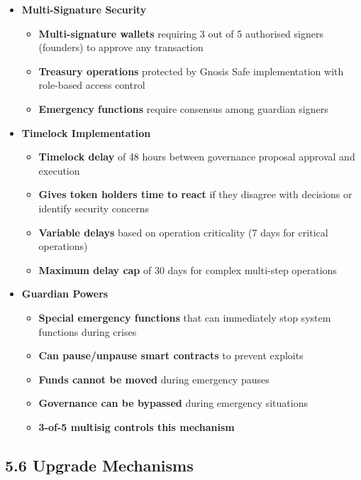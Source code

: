 \documentclass[
  paper=a4,
  ,captions=tableheading
]{scrartcl}
\providecommand{\tightlist}{%
  \setlength{\itemsep}{0pt}\setlength{\parskip}{0pt}}
\begin{document}
\begin{itemize}
\tightlist
\item
  \textbf{Multi-Signature Security}

  \begin{itemize}
  \tightlist
  \item
    \textbf{Multi-signature wallets} requiring 3 out of 5 authorised
    signers (founders) to approve any transaction
  \item
    \textbf{Treasury operations} protected by Gnosis Safe implementation
    with role-based access control
  \item
    \textbf{Emergency functions} require consensus among guardian
    signers
  \end{itemize}
\item
  \textbf{Timelock Implementation}

  \begin{itemize}
  \tightlist
  \item
    \textbf{Timelock delay} of 48 hours between governance proposal
    approval and execution
  \item
    \textbf{Gives token holders time to react} if they disagree with
    decisions or identify security concerns
  \item
    \textbf{Variable delays} based on operation criticality (7 days for
    critical operations)
  \item
    \textbf{Maximum delay cap} of 30 days for complex multi-step
    operations
  \end{itemize}
\item
  \textbf{Guardian Powers}

  \begin{itemize}
  \tightlist
  \item
    \textbf{Special emergency functions} that can immediately stop
    system functions during crises
  \item
    \textbf{Can pause/unpause smart contracts} to prevent exploits
  \item
    \textbf{Funds cannot be moved} during emergency pauses
  \item
    \textbf{Governance can be bypassed} during emergency situations
  \item
    \textbf{3-of-5 multisig controls this mechanism}
  \end{itemize}
\end{itemize}

\subsection{5.6 Upgrade Mechanisms}\label{upgrade-mechanisms}
\end{document}
